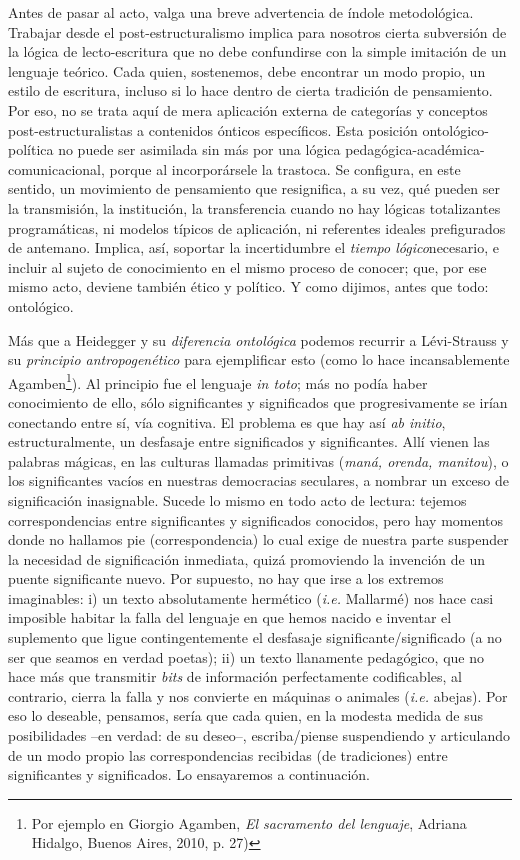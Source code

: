 \documentclass{book}
\begin{document}
Antes de pasar al acto, valga una breve advertencia de índole
metodológica. Trabajar desde el post-estructuralismo implica para
nosotros cierta subversión de la lógica de lecto-escritura que no debe
confundirse con la simple imitación de un lenguaje teórico. Cada quien,
sostenemos, debe encontrar un modo propio, un estilo de escritura,
incluso si lo hace dentro de cierta tradición de pensamiento. Por eso,
no se trata aquí de mera aplicación externa de categorías y conceptos
post-estructuralistas a contenidos ónticos específicos. Esta posición
ontológico-política no puede ser asimilada sin más por una lógica
pedagógica-académica-comunicacional, porque al incorporársele la
trastoca. Se configura, en este sentido, un movimiento de pensamiento
que resignifica, a su vez, qué pueden ser la transmisión, la
institución, la transferencia cuando no hay lógicas totalizantes
programáticas, ni modelos típicos de aplicación, ni referentes ideales
prefigurados de antemano. Implica, así, soportar la incertidumbre el
\emph{tiempo lógico}necesario, e incluir al sujeto de conocimiento en el
mismo proceso de conocer; que, por ese mismo acto, deviene también ético
y político. Y como dijimos, antes que todo: ontológico.

Más que a Heidegger y su \emph{diferencia ontológica} podemos recurrir a
Lévi-Strauss y su \emph{principio antropogenético} para ejemplificar
esto (como lo hace incansablemente Agamben\footnote{Por ejemplo en
  Giorgio Agamben, \emph{El sacramento del lenguaje}, Adriana Hidalgo,
  Buenos Aires, 2010, p. 27)}). Al principio fue el lenguaje \emph{in
toto}; más no podía haber conocimiento de ello, sólo significantes y
significados que progresivamente se irían conectando entre sí, vía
cognitiva. El problema es que hay así \emph{ab initio},
estructuralmente, un desfasaje entre significados y significantes. Allí
vienen las palabras mágicas, en las culturas llamadas primitivas
(\emph{maná, orenda, manitou}), o los significantes vacíos en nuestras
democracias seculares, a nombrar un exceso de significación inasignable.
Sucede lo mismo en todo acto de lectura: tejemos correspondencias entre
significantes y significados conocidos, pero hay momentos donde no
hallamos pie (correspondencia) lo cual exige de nuestra parte suspender
la necesidad de significación inmediata, quizá promoviendo la invención
de un puente significante nuevo. Por supuesto, no hay que irse a los
extremos imaginables: i) un texto absolutamente hermético (\emph{i.e.}
Mallarmé) nos hace casi imposible habitar la falla del lenguaje en que
hemos nacido e inventar el suplemento que ligue contingentemente el
desfasaje significante/significado (a no ser que seamos en verdad
poetas); ii) un texto llanamente pedagógico, que no hace más que
transmitir \emph{bits} de información perfectamente codificables, al
contrario, cierra la falla y nos convierte en máquinas o animales
(\emph{i.e.} abejas). Por eso lo deseable, pensamos, sería que cada
quien, en la modesta medida de sus posibilidades --en verdad: de su
deseo--, escriba/piense suspendiendo y articulando de un modo propio las
correspondencias recibidas (de tradiciones) entre significantes y
significados. Lo ensayaremos a continuación.
\end{document}
